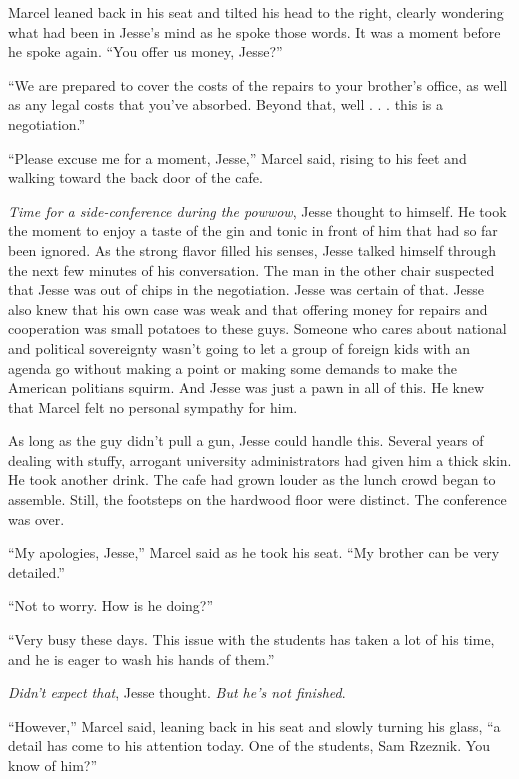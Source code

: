 \documentclass[12pt]{book}
\begin{document}
Marcel leaned back in his seat and tilted his head to the right, clearly wondering what had been in Jesse's mind as he spoke those words.  It was a moment before he spoke again.  ``You offer us money, Jesse?''

``We are prepared to cover the costs of the repairs to your brother's office, as well as any legal costs that you've absorbed.  Beyond that, well . . . this is a negotiation.''

``Please excuse me for a moment, Jesse,'' Marcel said, rising to his feet and walking toward the back door of the cafe.

\emph{Time for a side-conference during the powwow}, Jesse thought to himself.  He took the moment to enjoy a taste of the gin and tonic in front of him that had so far been ignored.  As the strong flavor filled his senses, Jesse talked himself through the next few minutes of his conversation.  The man in the other chair suspected that Jesse was out of chips in the negotiation.  Jesse was certain of that.  Jesse also knew that his own case was weak and that offering money for repairs and cooperation was small potatoes to these guys.  Someone who cares about national and political sovereignty wasn't going to let a group of foreign kids with an agenda go without making a point or making some demands to make the American politians squirm.  And Jesse was just a pawn in all of this.  He knew that Marcel felt no personal sympathy for him.

As long as the guy didn't pull a gun, Jesse could handle this.  Several years of dealing with stuffy, arrogant university administrators had given him a thick skin.  He took another drink.  The cafe had grown louder as the lunch crowd began to assemble.  Still, the footsteps on the hardwood floor were distinct.  The conference was over.

``My apologies, Jesse,'' Marcel said as he took his seat.  ``My brother can be very detailed.''

``Not to worry.  How is he doing?''

``Very busy these days.  This issue with the students has taken a lot of his time, and he is eager to wash his hands of them.''

\emph{Didn't expect that}, Jesse thought.  \emph{But he's not finished}.

``However,'' Marcel said, leaning back in his seat and slowly turning his glass, ``a detail has come to his attention today.  One of the students, Sam Rzeznik.  You know of him?''
\end{document}
